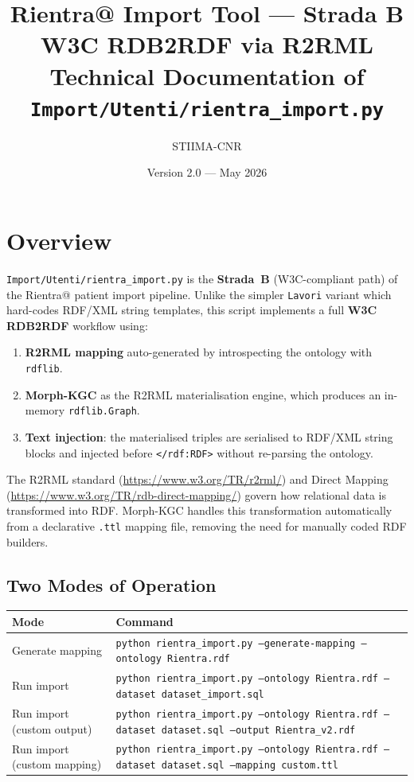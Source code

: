 ﻿\documentclass[12pt,a4paper]{article}
\title{\textbf{Rientra@ Import Tool --- Strada B}\\[0.4em]
       \large W3C RDB2RDF via R2RML\\[0.4em]
       \normalsize Technical Documentation of\\
       \texttt{Import/Utenti/rientra\_import.py}}
\author{STIIMA-CNR}
\date{Version 2.0 --- May 2026}
\begin{document}
\begin{titlepage}\centering\maketitle\end{titlepage}
\tableofcontents
\newpage

\clearpage
\section{Overview}

\texttt{Import/Utenti/rientra\_import.py} is the \textbf{Strada~B} (W3C-compliant path) of the Rientra@ patient import pipeline. Unlike the simpler \texttt{Lavori} variant which hard-codes RDF/XML string templates, this script implements a full \textbf{W3C RDB2RDF} workflow using:

\begin{enumerate}[noitemsep]
  \item \textbf{R2RML mapping} auto-generated by introspecting the ontology with \texttt{rdflib}.
  \item \textbf{Morph-KGC} as the R2RML materialisation engine, which produces an in-memory \texttt{rdflib.Graph}.
  \item \textbf{Text injection}: the materialised triples are serialised to RDF/XML string blocks and injected before \texttt{</rdf:RDF>} without re-parsing the ontology.
\end{enumerate}

\begin{tcolorbox}[colback=noteblue!40, colframe=blue!60!black, title=Design Principle: Standard Compliance]
The R2RML standard (\url{https://www.w3.org/TR/r2rml/}) and Direct Mapping (\url{https://www.w3.org/TR/rdb-direct-mapping/}) govern how relational data is transformed into RDF. Morph-KGC handles this transformation automatically from a declarative \texttt{.ttl} mapping file, removing the need for manually coded RDF builders.
\end{tcolorbox}

\subsection{Two Modes of Operation}

\begin{longtable}{@{}P{4cm}P{10.5cm}@{}}
\toprule
\textbf{Mode} & \textbf{Command} \\
\midrule
\endhead
Generate mapping &
  \texttt{python rientra\_import.py --generate-mapping --ontology Rientra.rdf} \\
Run import &
  \texttt{python rientra\_import.py --ontology Rientra.rdf --dataset dataset\_import.sql} \\
Run import (custom output) &
  \texttt{python rientra\_import.py --ontology Rientra.rdf --dataset dataset.sql --output Rientra\_v2.rdf} \\
Run import (custom mapping) &
  \texttt{python rientra\_import.py --ontology Rientra.rdf --dataset dataset.sql --mapping custom.ttl} \\
\bottomrule
\end{longtable}
\end{document}
